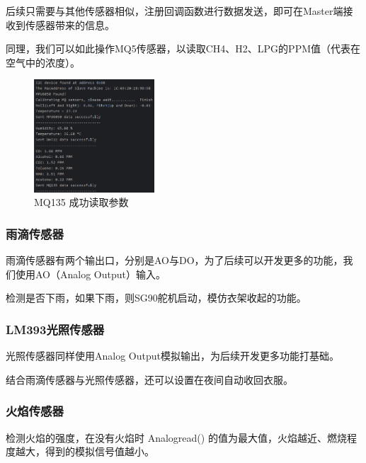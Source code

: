 后续只需要与其他传感器相似，注册回调函数进行数据发送，即可在Master端接收到传感器带来的信息。

同理，我们可以如此操作MQ5传感器，以读取CH4、H2、LPG的PPM值（代表在空气中的浓度）。

\begin{figure} [H]
    \centering
    \includegraphics[width=0.4\textwidth]{img/MQ135_active.png}
    \caption{MQ135 成功读取参数}
    \label{fig:MQ135_active}
\end{figure}

\subsubsection{雨滴传感器}

雨滴传感器有两个输出口，分别是AO与DO，为了后续可以开发更多的功能，我们使用AO（Analog Output）输入。

检测是否下雨，如果下雨，则SG90舵机启动，模仿衣架收起的功能。

\subsubsection{LM393光照传感器}

光照传感器同样使用Analog Output模拟输出，为后续开发更多功能打基础。

结合雨滴传感器与光照传感器，还可以设置在夜间自动收回衣服。

\subsubsection{火焰传感器}

检测火焰的强度，在没有火焰时 Analogread() 的值为最大值，火焰越近、燃烧程度越大，得到的模拟信号值越小。